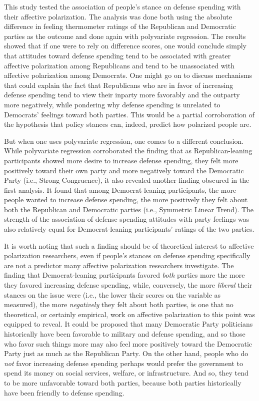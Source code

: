 \documentclass[authordate, meta, issue]{jote-new-article}
\begin{document}
	This study tested the association of people's stance on defense spending with their affective polarization. The analysis was done both using the absolute difference in feeling thermometer ratings of the Republican and Democratic parties as the outcome and done again with polyvariate regression. The results showed that if one were to rely on difference scores, one would conclude simply that attitudes toward defense spending tend to be associated with greater affective polarization among Republicans and tend to be unassociated with affective polarization among Democrats. One might go on to discuss mechanisms that could explain the fact that Republicans who are in favor of increasing defense spending tend to view their inparty more favorably and the outparty more negatively, while pondering why defense spending is unrelated to Democrats' feelings toward both parties. This would be a partial corroboration of the hypothesis that policy stances can, indeed, predict how polarized people are.



	But when one uses polyvariate regression, one comes to a different conclusion. While polyvariate regression corroborated the finding that as Republican-leaning participants showed more desire to increase defense spending, they felt more positively toward their own party and more negatively toward the Democratic Party (i.e., Strong Congruence), it also revealed another finding obscured in the first analysis. It found that among Democrat-leaning participants, the more people wanted to increase defense spending, the more positively they felt about both the Republican and Democratic parties (i.e., Symmetric Linear Trend). The strength of the association of defense spending attitudes with party feelings was also relatively equal for Democrat-leaning participants' ratings of the two parties.



	It is worth noting that such a finding should be of theoretical interest to affective polarization researchers, even if people's stances on defense spending specifically are not a predictor many affective polarization researchers investigate. The finding that Democrat-leaning participants favored \emph{both} parties more the more they favored increasing defense spending, while, conversely, the more \emph{liberal} their stances on the issue were (i.e., the lower their scores on the variable as measured), the more \emph{negatively} they felt about both parties, is one that no theoretical, or certainly empirical, work on affective polarization to this point was equipped to reveal. It could be proposed that many Democratic Party politicians historically have been favorable to military and defense spending, and so those who favor such things more may also feel more positively toward the Democratic Party just as much as the Republican Party. On the other hand, people who do \emph{not} favor increasing defense spending perhaps would prefer the government to spend its money on social services, welfare, or infrastructure. And so, they tend to be more unfavorable toward both parties, because both parties historically have been friendly to defense spending.
\end{document}
